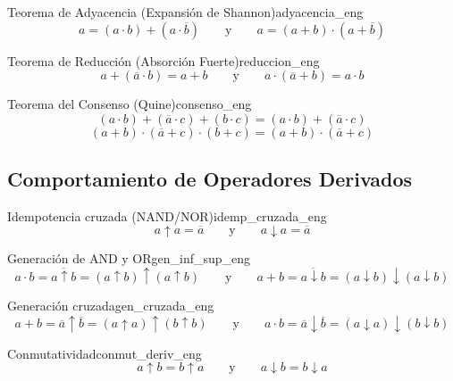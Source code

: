 \setcounter{tcb@cnt@teorema}{13}
\begin{teorema}{Teorema de Adyacencia (Expansión de Shannon)}{adyacencia_eng}
\[ a = (a \cdot b) + (a \cdot \overline{b}) \qquad \text{y} \qquad a = (a + b) \cdot (a + \overline{b}) \]
\end{teorema}

\setcounter{tcb@cnt@teorema}{14}
\begin{teorema}{Teorema de Reducción (Absorción Fuerte)}{reduccion_eng}
\[ a + (\overline{a} \cdot b) = a + b \qquad \text{y} \qquad a \cdot (\overline{a} + b) = a \cdot b \]
\end{teorema}

\setcounter{tcb@cnt@teorema}{15}
\begin{teorema}{Teorema del Consenso (Quine)}{consenso_eng}
\[ (a \cdot b) + (\overline{a} \cdot c) + (b \cdot c) = (a \cdot b) + (\overline{a} \cdot c) \]
\[ (a + b) \cdot (\overline{a} + c) \cdot (b + c) = (a + b) \cdot (\overline{a} + c) \]
\end{teorema}

\subsection*{Comportamiento de Operadores Derivados}

\setcounter{tcb@cnt@teorema}{13}
\begin{teorema}{Idempotencia cruzada (NAND/NOR)}{idemp_cruzada_eng}
\[ a \uparrow a = \overline{a} \qquad \text{y} \qquad a \downarrow a = \overline{a} \]
\end{teorema}

\setcounter{tcb@cnt@teorema}{14}
\begin{teorema}{Generación de AND y OR}{gen_inf_sup_eng}
\[ a \cdot b = \overline{a \uparrow b} = (a \uparrow b) \uparrow (a \uparrow b) \qquad \text{y} \qquad a + b = \overline{a \downarrow b} = (a \downarrow b) \downarrow (a \downarrow b) \]
\end{teorema}

\setcounter{tcb@cnt@teorema}{15}
\begin{teorema}{Generación cruzada}{gen_cruzada_eng}
\[ a + b = \overline{a} \uparrow \overline{b} = (a \uparrow a) \uparrow (b \uparrow b) \qquad \text{y} \qquad a \cdot b = \overline{a} \downarrow \overline{b} = (a \downarrow a) \downarrow (b \downarrow b) \]
\end{teorema}

\setcounter{tcb@cnt@teorema}{16}
\begin{teorema}{Conmutatividad}{conmut_deriv_eng}
\[ a \uparrow b = b \uparrow a \qquad \text{y} \qquad a \downarrow b = b \downarrow a \]
\end{teorema}

